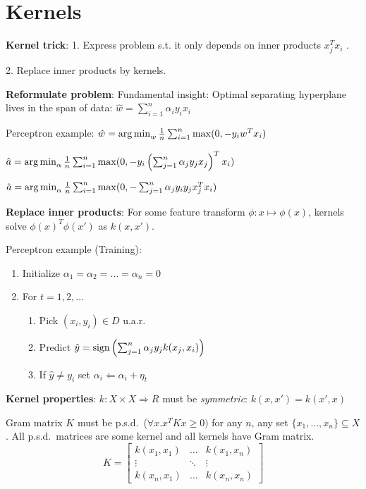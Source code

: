\section{Kernels}
\textbf{Kernel trick}: 1. Express problem s.t. it only depends on inner products $x_j^T x_i$ .

2. Replace inner products by kernels.

\textbf{Reformulate problem}: 
Fundamental insight: Optimal separating hyperplane lives in the span of data: $\hat{w} = \sum_{i=1}^n \alpha_i y_i x_i$

Perceptron example:
$\hat{w} = \operatorname*{arg\,min}_w \frac{1}{n} \sum_{i=1}^n \max(0, -y_i w^T x_i)$

$\hat{a} = \operatorname*{arg\,min}_\alpha \frac{1}{n} \sum_{i=1}^n \max(0, -y_i \left(\sum_{j=1}^n \alpha_j y_j x_j\right)^T x_i)$

$\hat{a} = \operatorname*{arg\,min}_\alpha \frac{1}{n} \sum_{i=1}^n \max(0,-\sum_{j=1}^n \alpha_j y_i y_j x_j^T x_i)$

\textbf{Replace inner products}: For some feature transform $\phi: x \mapsto \phi(x)$, kernels solve $\phi(x)^T \phi(x')$  as $k(x, x')$.

Perceptron example (Training):

\begin{enumerate}
    \item Initialize $\alpha_1 = \alpha_2 = \dots = \alpha_n = 0$
    \item For $t = 1, 2, \dots$
        \begin{enumerate}
            \item Pick $(x_i, y_i) \in D$ u.a.r.
            \item Predict $\hat{y} = \operatorname*{sign}\left(\sum_{j=1}^n \alpha_j y_j k(x_j, x_i)\right)$
            \item If $\hat{y} \neq y_i$ set $\alpha_i \Leftarrow \alpha_i + \eta_t$
        \end{enumerate}
\end{enumerate}

\textbf{Kernel properties}: $k: X \times X \Rightarrow R$ must be \emph{symmetric}: $k(x, x') = k(x', x)$

Gram matrix $K$ must be p.s.d.\ ($\forall x. x^T K x \geq 0)$ for any $n$, any
set $\{x_1, \dots, x_n\} \subseteq X$. All p.s.d.\ matrices are some kernel
and all kernels have Gram matrix.
\[
    K = \begin{bmatrix}k(x_1,x_1) & \dots & k(x_1, x_n) \\ \vdots & \ddots &
    \vdots \\ k(x_n, x_1) & \dots & k(x_n, x_n)\end{bmatrix}
\]


